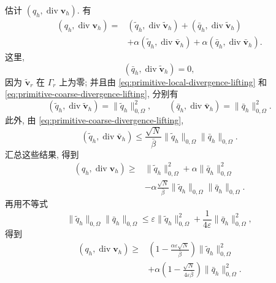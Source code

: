 \begin{Proof}
估计 $(q_h,\operatorname{div}\mathbf v_h)$. 有
\[
\begin{split}
(q_h,\operatorname{div}\mathbf v_h)
={}&(\tilde q_h,\operatorname{div}\tilde{\mathbf v}_h)
+(\bar q_h,\operatorname{div}\tilde{\mathbf v}_h)\\
&+\alpha(\tilde q_h,\operatorname{div}\bar{\mathbf v}_h)
+\alpha(\bar q_h,\operatorname{div}\bar{\mathbf v}_h).
\end{split}
\]
这里,
\[
(\bar q_h,\operatorname{div}\tilde{\mathbf v}_h)=0,
\]
因为 $\tilde{\mathbf v}_r$ 在 $\Gamma_r$ 上为零; 并且由
\eqref{eq:primitive-local-divergence-lifting} 和
\eqref{eq:primitive-coarse-divergence-lifting}, 分别有
\[
(\tilde q_h,\operatorname{div}\tilde{\mathbf v}_h)
=\|\tilde q_h\|_{0,\Omega}^2,
\qquad
(\bar q_h,\operatorname{div}\bar{\mathbf v}_h)
=\|\bar q_h\|_{0,\Omega}^2.
\]
此外, 由 \eqref{eq:primitive-coarse-divergence-lifting},
\[
(\tilde q_h,\operatorname{div}\bar{\mathbf v}_h)
\leq\frac{\sqrt N}{\bar\beta}
\|\tilde q_h\|_{0,\Omega}\|\bar q_h\|_{0,\Omega}.
\]
汇总这些结果, 得到
\[
\begin{split}
(q_h,\operatorname{div}\mathbf v_h)
\geq{}&\|\tilde q_h\|_{0,\Omega}^2
+\alpha\|\bar q_h\|_{0,\Omega}^2\\
&-\alpha\frac{\sqrt N}{\bar\beta}
\|\tilde q_h\|_{0,\Omega}\|\bar q_h\|_{0,\Omega}.
\end{split}
\]
再用不等式
\[
\|\tilde q_h\|_{0,\Omega}\|\bar q_h\|_{0,\Omega}
\leq\varepsilon\|\tilde q_h\|_{0,\Omega}^2
+\frac{1}{4\varepsilon}\|\bar q_h\|_{0,\Omega}^2,
\]
得到
\[
\begin{split}
(q_h,\operatorname{div}\mathbf v_h)
\geq{}&\left(1-\frac{\alpha\varepsilon\sqrt N}{\bar\beta}\right)
\|\tilde q_h\|_{0,\Omega}^2\\
&+\alpha\left(1-\frac{\sqrt N}{4\varepsilon\bar\beta}\right)
\|\bar q_h\|_{0,\Omega}^2.
\end{split}
\]


\end{Proof}
